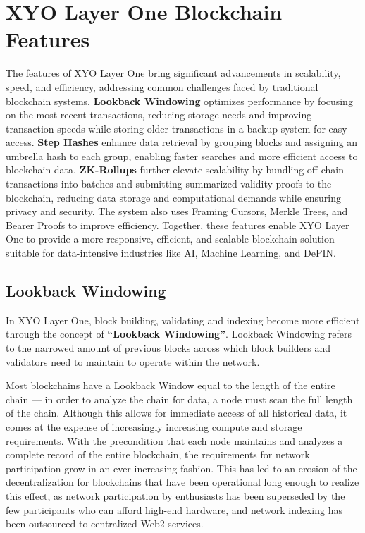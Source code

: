 \documentclass{article}
\begin{document}
\section{XYO Layer One Blockchain Features}
The features of XYO Layer One bring significant advancements in scalability,
speed, and efficiency, addressing common challenges faced by traditional
blockchain systems. \textbf{Lookback Windowing} optimizes performance by
focusing on the most recent transactions, reducing storage needs and improving
transaction speeds while storing older transactions in a backup system for easy
access. \textbf{Step Hashes} enhance data retrieval by grouping blocks and
assigning an umbrella hash to each group, enabling faster searches and more
efficient access to blockchain data. \textbf{ZK-Rollups} further elevate
scalability by bundling off-chain transactions into batches and submitting
summarized validity proofs to the blockchain, reducing data storage and
computational demands while ensuring privacy and security. The system also uses
Framing Cursors, Merkle Trees, and Bearer Proofs to improve efficiency.
Together, these features enable XYO Layer One to provide a more responsive,
efficient, and scalable blockchain solution suitable for data-intensive
industries like AI, Machine Learning, and DePIN.

\subsection{Lookback Windowing}
In XYO Layer One, block building, validating and indexing become more efficient
through the concept of \textbf{“Lookback Windowing”}. Lookback Windowing refers
to the narrowed amount of previous blocks across which block builders and
validators need to maintain to operate within the network.

Most blockchains have a Lookback Window equal to the length of the entire chain
— in order to analyze the chain for data, a node must scan the full length of
the chain. Although this allows for immediate access of all historical data, it
comes at the expense of increasingly increasing compute and storage
requirements. With the precondition that each node maintains and analyzes a
complete record of the entire blockchain, the requirements for network
participation grow in an ever increasing fashion. This has led to an erosion of
the decentralization for blockchains that have been operational long enough to
realize this effect, as network participation by enthusiasts has been
superseded by the few participants who can afford high-end hardware, and
network indexing has been outsourced to centralized Web2 services.
\end{document}
